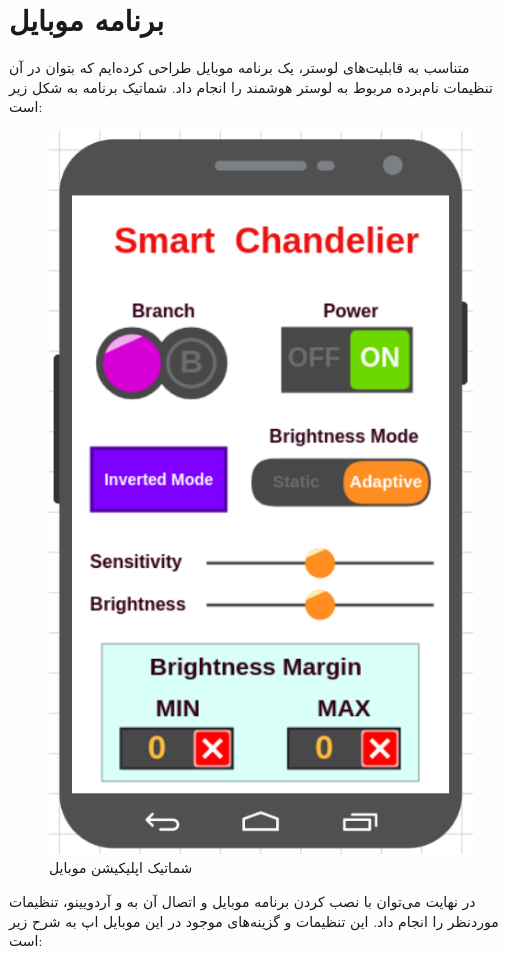 \documentclass[12pt,a4paper]{article}
\begin{document}
	
\section{برنامه موبایل}
متناسب به قابلیت‌های لوستر، یک برنامه موبایل طراحی کرده‌ایم که بتوان در آن تنظیمات نام‌برده مربوط به لوستر هوشمند را انجام داد. شماتیک برنامه به شکل زیر است:

	\begin{figure}[H]
	\centering
	\includegraphics[scale=0.5]{figs/shcema-ma.png}
	\caption{
		شماتیک اپلیکیشن موبایل
	}
	\label{fig:schema}
\end{figure}
در نهایت می‌توان با نصب کردن برنامه موبایل و اتصال آن به  و آردویینو، تنظیمات موردنظر را انجام داد. این تنظیمات و گزینه‌های موجود در این موبایل اپ به شرح زیر است:
\end{document}
